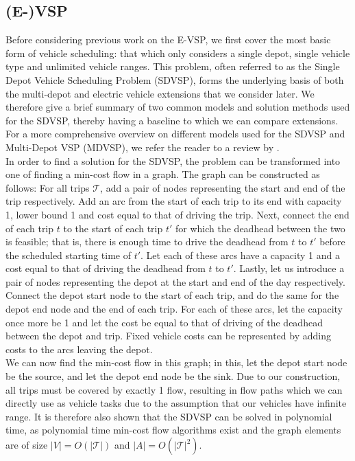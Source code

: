 \documentclass[]{article}
\begin{document}
\subsection{(E-)VSP}
Before considering previous work on the E-VSP, we first cover the most basic form of vehicle scheduling: that which only considers a single depot, single vehicle type and unlimited vehicle ranges. This problem, often referred to as the Single Depot Vehicle Scheduling Problem (SDVSP), forms the underlying basis of both the multi-depot and electric vehicle extensions that we consider later. We therefore give a brief summary of two common models and solution methods used for the SDVSP, thereby having a baseline to which we can compare extensions. For a more comprehensive overview on different models used for the SDVSP and Multi-Depot VSP (MDVSP), we refer the reader to a review by \citet{Bunte2009}. \\
In order to find a solution for the SDVSP, the problem can be transformed into one of finding a min-cost flow in a graph. The graph can be constructed as follows: For all trips $\mathcal{T}$, add a pair of nodes representing the start and end of the trip respectively. Add an arc from the start of each trip to its end with capacity 1, lower bound 1 and cost equal to that of driving the trip. Next, connect the end of each trip $t$ to the start of each trip $t'$ for which the deadhead between the two is feasible; that is, there is enough time to drive the deadhead from $t$ to $t'$ before the scheduled starting time of $t'$. Let each of these arcs have a capacity 1 and a cost equal to that of driving the deadhead from $t$ to $t'$. Lastly, let us introduce a pair of nodes representing the depot at the start and end of the day respectively. Connect the depot start node to the start of each trip, and do the same for the depot end node and the end of each trip. For each of these arcs, let the capacity once more be 1 and let the cost be equal to that of driving of the deadhead between the depot and trip. Fixed vehicle costs can be represented by adding costs to the arcs leaving the depot. \\
We can now find the min-cost flow in this graph; in this, let the depot start node be the source, and let the depot end node be the sink. Due to our construction, all trips must be covered by exactly 1 flow, resulting in flow paths which we can directly use as vehicle tasks due to the assumption that our vehicles have infinite range. It is therefore also shown that the SDVSP can be solved in polynomial time, as polynomial time min-cost flow algorithms exist and the graph elements are of size $|V| = O(|\mathcal{T}|)$ and $|A| = O(|\mathcal{T}|^2)$.\\ 
\end{document}

